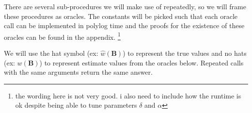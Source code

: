 \documentclass[11pt]{article}
\theoremstyle{definition}
\theoremstyle{remark}
\newcommand{\B}{\mathcal{B}}
\newcommand{\U}{\mathcal{U}}
\begin{document}

There are several sub-procedures we will make use of repeatedly, so we will frame these procedures as oracles. The constants will be picked such that each oracle call can be implemented in polylog time and the proofs for the existence of these oracles can be found in the appendix. \footnote{the wording here is not very good. i also need to include how the runtime is ok despite being able to tune parameters \(\delta\) and \(\alpha\)}

We will use the hat symbol (ex: \(\hat w(\bm B)\)) to represent the true values and no hats (ex: \(w(\bm B)\)) to represent estimate values from the oracles below. Repeated calls with the same arguments return the same answer.
\end{document}
